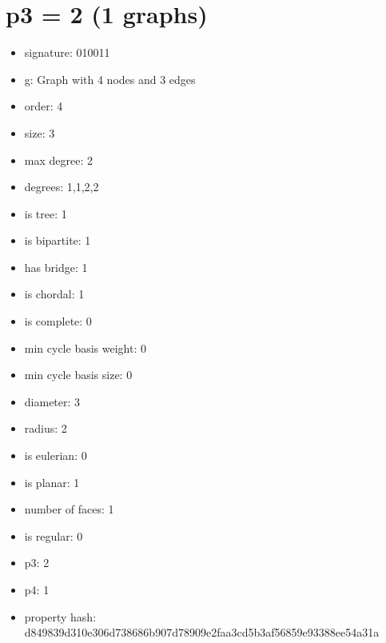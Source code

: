 \chapter{p3 = 2 (1 graphs)}
\newpage\begin{figure}
\end{figure}
\begin{itemize}
\item signature: 010011
\item g: Graph with 4 nodes and 3 edges
\item order: 4
\item size: 3
\item max degree: 2
\item degrees: 1,1,2,2
\item is tree: 1
\item is bipartite: 1
\item has bridge: 1
\item is chordal: 1
\item is complete: 0
\item min cycle basis weight: 0
\item min cycle basis size: 0
\item diameter: 3
\item radius: 2
\item is eulerian: 0
\item is planar: 1
\item number of faces: 1
\item is regular: 0
\item p3: 2
\item p4: 1
\item property hash: d849839d310e306d738686b907d78909e2faa3cd5b3af56859e93388ee54a31a
\end{itemize}
\newpage
